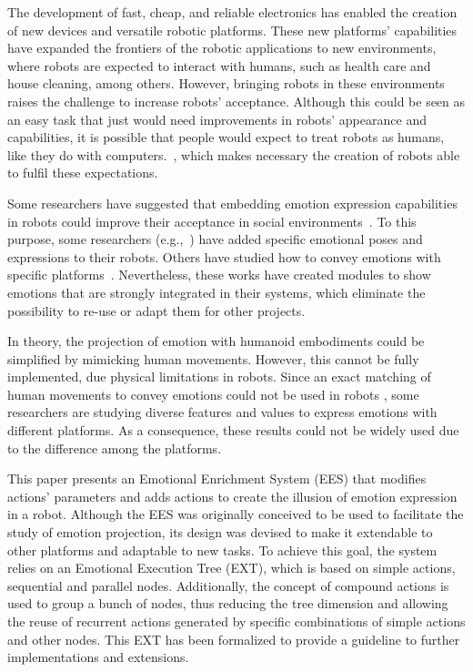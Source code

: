 The development of fast, cheap, and reliable electronics has enabled the creation of new devices and versatile robotic platforms. These new platforms' capabilities have expanded the frontiers of the robotic applications to new environments, where robots are expected to interact with humans, such as health care and house cleaning, among others. However, bringing robots in these environments raises the challenge to increase robots' acceptance. Although this could be seen as an easy task that just would need improvements in robots' appearance and capabilities, it is possible that people would expect to treat robots as humans, like they do with computers.~\cite{Reeves1996}, which makes necessary the creation of robots able to fulfil these expectations.

Some researchers have suggested that embedding emotion expression capabilities in robots could improve their acceptance in social environments~\cite{Pavia2014}. To this purpose, some researchers (e.g.,~\cite{Breazeal2002, Arras2012}) have added specific emotional poses and expressions to their robots. Others have studied how to convey emotions with specific platforms~\cite{Li2011, Brown2014}. Nevertheless, these works have created modules to show emotions that are strongly integrated in their systems, which eliminate the possibility to re-use or adapt them for other projects.

In theory, the projection of emotion with humanoid embodiments could be simplified by mimicking human movements. However, this cannot be fully implemented, due physical limitations in robots. Since an exact matching of human movements to convey emotions could not be used in robots \cite{Saerbeck2007,Canamero2010}, some researchers are studying diverse features and values to express emotions with different platforms. As a consequence, these results could not be widely used due to the difference among the platforms.

This paper presents an Emotional Enrichment System (EES) that modifies actions' parameters and adds actions to create the illusion of emotion expression in a robot. Although the EES was originally conceived to be used to facilitate the study of emotion projection, its design was devised to make it extendable to other platforms and adaptable to new tasks. To achieve this goal, the system relies on an Emotional Execution Tree (EXT), which is based on simple actions, sequential and parallel nodes. Additionally, the concept of compound actions is used to group a bunch of nodes, thus reducing the tree dimension and allowing the reuse of recurrent actions generated by specific combinations of simple actions and other nodes. This EXT has been formalized to provide a guideline to further implementations and extensions.
 
